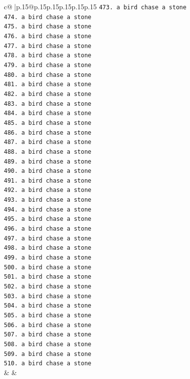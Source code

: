\documentclass{article}
\begin{document}
{\begin{supertabular}{c@{$\;$}|p{.15\linewidth}@{}p{.15\linewidth}p{.15\linewidth}p{.15\linewidth}p{.15\linewidth}p{.15\linewidth}}
{{{\texttt{473. a bird chase a stone} \\
\texttt{474. a bird chase a stone} \\
\texttt{475. a bird chase a stone} \\
\texttt{476. a bird chase a stone} \\
\texttt{477. a bird chase a stone} \\
\texttt{478. a bird chase a stone} \\
\texttt{479. a bird chase a stone} \\
\texttt{480. a bird chase a stone} \\
\texttt{481. a bird chase a stone} \\
\texttt{482. a bird chase a stone} \\
\texttt{483. a bird chase a stone} \\
\texttt{484. a bird chase a stone} \\
\texttt{485. a bird chase a stone} \\
\texttt{486. a bird chase a stone} \\
\texttt{487. a bird chase a stone} \\
\texttt{488. a bird chase a stone} \\
\texttt{489. a bird chase a stone} \\
\texttt{490. a bird chase a stone} \\
\texttt{491. a bird chase a stone} \\
\texttt{492. a bird chase a stone} \\
\texttt{493. a bird chase a stone} \\
\texttt{494. a bird chase a stone} \\
\texttt{495. a bird chase a stone} \\
\texttt{496. a bird chase a stone} \\
\texttt{497. a bird chase a stone} \\
\texttt{498. a bird chase a stone} \\
\texttt{499. a bird chase a stone} \\
\texttt{500. a bird chase a stone} \\
\texttt{501. a bird chase a stone} \\
\texttt{502. a bird chase a stone} \\
\texttt{503. a bird chase a stone} \\
\texttt{504. a bird chase a stone} \\
\texttt{505. a bird chase a stone} \\
\texttt{506. a bird chase a stone} \\
\texttt{507. a bird chase a stone} \\
\texttt{508. a bird chase a stone} \\
\texttt{509. a bird chase a stone} \\
\texttt{510. a bird chase a stone} \\
            }
        }
    }
    & & \\ \\


\end{supertabular}}
\end{document}
